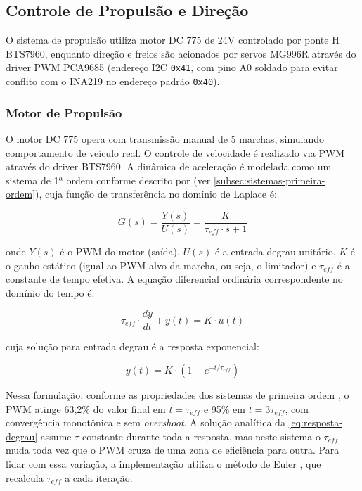 \subsection{Controle de Propulsão e Direção}
\label{subsec:propulsao-direcao-veiculo}

O sistema de propulsão utiliza motor DC 775 de 24V controlado por ponte H BTS7960, enquanto direção e freios são acionados por servos MG996R através do driver PWM PCA9685 (endereço \gls{I2C} \texttt{0x41}, com pino A0 soldado para evitar conflito com o INA219 no endereço padrão \texttt{0x40}).

\subsubsection{Motor de Propulsão}

O motor DC 775 opera com transmissão manual de 5 marchas, simulando comportamento de veículo real. O controle de velocidade é realizado via PWM através do driver BTS7960. A dinâmica de aceleração é modelada como um sistema de 1ª ordem conforme descrito por  (ver \autoref{subsec:sistemas-primeira-ordem}), cuja função de transferência no domínio de Laplace é:

\begin{equation}
\label{eq:funcao-transferencia}
G(s) = \frac{Y(s)}{U(s)} = \frac{K}{\tau_{eff} \cdot s + 1}
\end{equation}

\noindent onde $Y(s)$ é o PWM do motor (saída), $U(s)$ é a entrada degrau unitário, $K$ é o ganho estático (igual ao PWM alvo da marcha, ou seja, o limitador) e $\tau_{eff}$ é a constante de tempo efetiva. A equação diferencial ordinária correspondente no domínio do tempo é:

\begin{equation}
\label{eq:ode-motor}
\tau_{eff} \cdot \frac{dy}{dt} + y(t) = K \cdot u(t)
\end{equation}

\noindent cuja solução para entrada degrau é a resposta exponencial:

\begin{equation}
\label{eq:resposta-degrau}
y(t) = K \cdot \left(1 - e^{-t/\tau_{eff}}\right)
\end{equation}

Nessa formulação, conforme as propriedades dos sistemas de primeira ordem \cite{franklin2013sistemas}, o PWM atinge 63,2\% do valor final em $t = \tau_{eff}$ e 95\% em $t = 3\tau_{eff}$, com convergência monotônica e sem \textit{overshoot}. A solução analítica da \autoref{eq:resposta-degrau} assume $\tau$ constante durante toda a resposta, mas neste sistema o $\tau_{eff}$ muda toda vez que o PWM cruza de uma zona de eficiência para outra. Para lidar com essa variação, a implementação utiliza o método de Euler \cite{ruggiero1996calculo}, que recalcula $\tau_{eff}$ a cada iteração.

